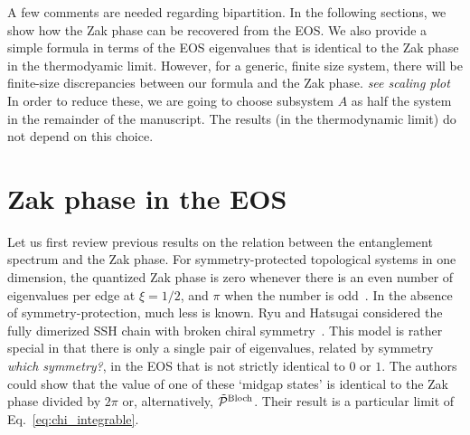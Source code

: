 \documentclass[twocolumn,amsmath,longbibliography,amssymb,superscriptaddress]{revtex4-1}
\newcommand{\mariac}[1]{{\it\color{cyan}#1}}
\begin{document}



A few comments are needed regarding  bipartition. 
In the following sections, we show how the Zak phase can be recovered from the EOS.
We also provide a simple formula in terms of the EOS eigenvalues that is identical to the Zak phase in the thermodyamic limit.  
However, for a generic, finite size system, there will be finite-size discrepancies between our formula and the Zak phase. \mariac{see scaling plot}
In order to reduce these, we are going to choose subsystem $A$ as half the system in the remainder of the manuscript.
The results (in the thermodynamic limit) do not depend on this choice. 
\section{Zak phase in the EOS}

Let us first review previous results on the relation between the entanglement spectrum and the Zak phase. 
For symmetry-protected topological systems in one dimension, the quantized Zak phase is zero whenever there is an even number  of eigenvalues per edge at $\xi = 1/2$, and $\pi$ when the number is odd~\cite{Peschel2008}. 
In the absence of symmetry-protection, much less is known. 
Ryu and Hatsugai considered the fully dimerized SSH chain with broken chiral symmetry~\cite{Ryu2006}.  
This model is rather special in that there is only a single pair of eigenvalues, related by symmetry \mariac{which symmetry?}, in the EOS that is not strictly identical to $0$ or $1$. 
The authors could show that the value of one of these `midgap states' is identical to the Zak phase divided by $2\pi$ or, alternatively, $\tilde{\mathcal{P}}^{\rm Bloch}$. 
Their result is a particular limit of Eq.~\eqref{eq:chi_integrable}. 
%
\end{document}
